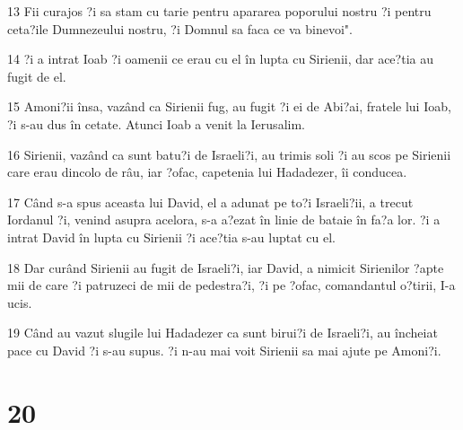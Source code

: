 \par 13 Fii curajos ?i sa stam cu tarie pentru apararea poporului nostru ?i pentru ceta?ile Dumnezeului nostru, ?i Domnul sa faca ce va binevoi".
\par 14 ?i a intrat Ioab ?i oamenii ce erau cu el în lupta cu Sirienii, dar ace?tia au fugit de el.
\par 15 Amoni?ii însa, vazând ca Sirienii fug, au fugit ?i ei de Abi?ai, fratele lui Ioab, ?i s-au dus în cetate. Atunci Ioab a venit la Ierusalim.
\par 16 Sirienii, vazând ca sunt batu?i de Israeli?i, au trimis soli ?i au scos pe Sirienii care erau dincolo de râu, iar ?ofac, capetenia lui Hadadezer, îi conducea.
\par 17 Când s-a spus aceasta lui David, el a adunat pe to?i Israeli?ii, a trecut Iordanul ?i, venind asupra acelora, s-a a?ezat în linie de bataie în fa?a lor. ?i a intrat David în lupta cu Sirienii ?i ace?tia s-au luptat cu el.
\par 18 Dar curând Sirienii au fugit de Israeli?i, iar David, a nimicit Sirienilor ?apte mii de care ?i patruzeci de mii de pedestra?i, ?i pe ?ofac, comandantul o?tirii, I-a ucis.
\par 19 Când au vazut slugile lui Hadadezer ca sunt birui?i de Israeli?i, au încheiat pace cu David ?i s-au supus. ?i n-au mai voit Sirienii sa mai ajute pe Amoni?i.

\chapter{20}

